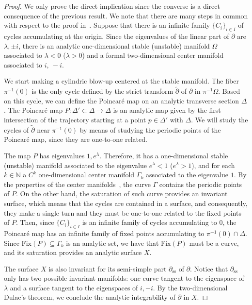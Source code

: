 \documentclass[10pt,twoside,reqno]{amsart}
\theoremstyle{remark}
\theoremstyle{remark}
\begin{document}
\begin{proof}
    We only prove the direct implication since the converse is a direct consequence of the previous result. We note that there are many steps in common with respect to the proof in~\cite{Corral2025}. Suppose that there is an infinite family $\{C_i\}_{i\in I}$ of cycles accumulating at the origin. 
    Since the eigenvalues of the linear part of $\partial$ are $\lambda,\pm i$, there is an analytic one-dimensional stable (unstable) manifold $\Omega$ associated to $\lambda<0$ ($\lambda>0$) and a formal two-dimensional center manifold associated to $i,\ -i$.
    
    We start making a cylindric blow-up centered at the stable manifold. The fiber $\pi^{-1}(0)$ is the only cycle defined by the strict transform $\widetilde \partial$ of $\partial$ in $\pi^{-1}\Omega$. Based on this cycle, we can define the Poincaré map on an analytic transverse section $\Delta$. The Poincaré map $P:\Delta' \subset \Delta \to \Delta$ is an analytic map given by the first intersection of the trajectory starting at a point $p\in \Delta'$ with $\Delta$. 
    We will study the cycles of $\widetilde{\partial}$ near $\pi^{-1}(0)$ by means of studying the periodic points of the Poincaré map, since they are one-to-one related.
    
    The map $P$ has eigenvalues $1, e^{\lambda}$. Therefore, it has a one-dimensional  stable (unstable) manifold associated to the eigenvalue $e^{\lambda}<1$ ($e^{\lambda}>1$), and for each $k\in \mathbb N$ a $C^k$ one-dimensional center manifold $\Gamma_k$ associated to the eigenvalue $1$. 
    By the properties of the center manifolds~\cite{Hirsch1970}, the curve $\Gamma$ contains the periodic points of $P$. On the other hand, the saturation of such curve provides an invariant surface, which means that the cycles are contained in a surface, and consequently, they make a single turn and they must be one-to-one related to the fixed points of $P$. Then, since $\{C_i\}_{i\in I}$ is an infinite family of cycles accumulating to $0$, the Poincaré map has an infinite family of fixed points accumulating to $\pi^{-1}(0)\cap \Delta$. Since $\textrm{Fix}(P)\subseteq \Gamma_k$ is an analytic set, we have that $\textrm{Fix}(P)$ must be a curve, and its saturation provides an analytic surface $X$. 
    
    The surface $X$ is also invariant for its semi-simple part $\partial_{\textrm{ss}}$ of $\partial$. Notice that $\partial_{\textrm{ss}}$ only has two possible invariant manifolds: one curve tangent to the eigenspace of $\lambda$ and a surface tangent to the eigenspaces of $i,-i$. By the two-dimensional Dulac's theorem, we conclude  the analytic integrability of $\partial$ in $X$.
\end{proof}
\end{document}
